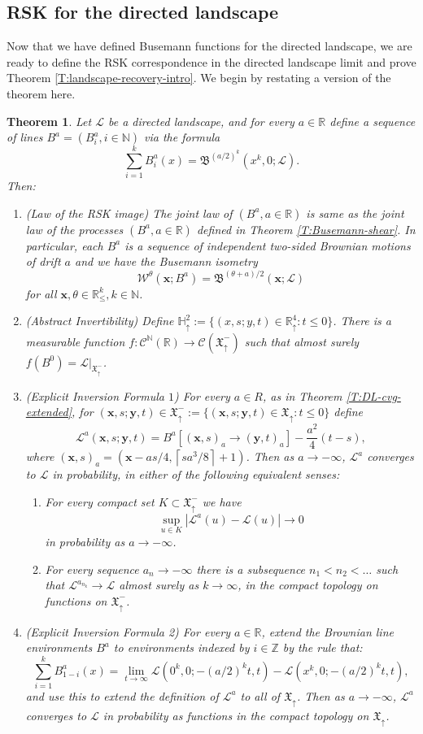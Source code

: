 \documentclass[11pt]{article}
\newcommand{\Z}{\mathbb{Z}}
\newcommand{\N}{\mathbb{N}}
\newcommand{\R}{\mathbb{R}}
\newcommand{\cl}[1]{{\left\lceil #1 \right\rceil}}
\newcommand{\Rd}{\mathbb{R}^4_\uparrow}
\newcommand{\cC}{\mathcal{C}}
\newcommand{\cL}{\mathcal{L}}
\newcommand{\cW}{\mathcal{W}}
\newcommand{\fB}{\mathfrak{B}}
\newcommand{\bx}{\mathbf{x}}
\newcommand{\by}{\mathbf{y}}
\newtheorem{theorem}{Theorem}[section]
\theoremstyle{definition} %
\theoremstyle{remark} %
\begin{document}
\subsection{RSK for the directed landscape}

Now that we have defined Busemann functions for the directed landscape, we are ready to define the RSK correspondence in the directed landscape limit and prove Theorem \ref{T:landscape-recovery-intro}. We begin by restating a version of the theorem here.

\begin{theorem}
\label{T:landscape-recovery}
Let $\cL$ be a directed landscape, and for every $a \in \R$ define a sequence of lines $B^a = (B^a_i, i \in \N)$ via the formula
$$
\sum_{i=1}^k B^a_i(x) = \fB^{(a/2)^k}(x^k, 0; \cL).
$$
Then:
\begin{enumerate}
	\item (Law of the RSK image) The joint law of $(B^a, a \in \R)$ is same as the joint law of the processes $(B^a, a \in \R)$ defined in Theorem \ref{T:Busemann-shear}. In particular, each $B^a$ is a sequence of independent two-sided Brownian motions of drift $a$ and we have the Busemann isometry
	$$
	\cW^{\theta}(\bx; B^a) = \fB^{(\theta + a)/2}(\bx; \cL)
	$$
	for all $\bx, \theta \in \R^k_\le, k \in \N$. 
	\item (Abstract Invertibility) Define $\mathbb H^2_\uparrow := \{(x, s; y, t) \in \Rd : t \le 0\}$. There is a measurable function $f:\cC^\N(\R) \to \cC(\mathfrak{X}^-_\uparrow)$ such that almost surely $f(B^0) = \cL|_{\mathfrak{X}^-_\uparrow}$.
	\item (Explicit Inversion Formula $1$) For every $a \in R$, as in Theorem \ref{T:DL-cvg-extended}, for $(\bx, s; \by, t) \in \mathfrak{X}^-_\uparrow :=\{(\bx, s; \by, t) \in \mathfrak{X}_\uparrow : t \le 0\}$ define
	$$
	\cL^a(\bx, s; \by, t) = B^a[(\bx, s)_a \to (\by, t)_a] - \frac{a^2}{4}(t-s),
	$$
	where $(\bx, s)_a = (\bx-as/4, \cl{s a^3/8} + 1)$. Then as $a \to -\infty$, $\cL^a$ converges to $\cL$ in probability, in either of the following equivalent senses:
	\begin{enumerate}
		\item For every compact set $K \subset \mathfrak{X}^-_\uparrow$ we have
		$$
		\sup_{u \in K} |\cL^a(u) - \cL(u)| \to 0
		$$
		in probability as $a \to -\infty$.
		\item For every sequence $a_n \to -\infty$ there is a subsequence $n_1 < n_2 < \dots$ such that $\cL^{a_{n_k}} \to \cL$ almost surely as $k \to \infty$, in the compact topology on functions on $\mathfrak{X}^-_\uparrow$.
			\end{enumerate}
		\item (Explicit Inversion Formula 2) For every $a \in \R$, extend the Brownian line environments $B^a$ to environments indexed by $i \in \Z$ by the rule that:
		$$
		\sum_{i=1}^k B^a_{1 - i}(x) = \lim_{t \to \infty} \cL(0^k,0; -(a/2)^k t, t) - \cL(x^k,0; -(a/2)^k t, t),
		$$
		and use this to extend the definition of $\cL^a$ to all of $\mathfrak X_\uparrow$. Then as $a \to - \infty$, $\cL^a$ converges to $\cL$ in probability as functions in the compact topology on $\mathfrak{X}_\uparrow$.
\end{enumerate}
\end{theorem}
\end{document}

